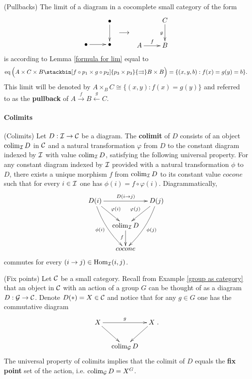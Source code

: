 \documentclass[thesis.tex]{subfiles}
\begin{document}
\begin{example}(Pullbacks)
The limit of a diagram in a cocomplete small category of the form \vspace*{-10pt}
$$\begin{array}{l}
\xymatrix{ & \bullet\ar[d] \\ \bullet\ar[r] & \bullet}
\end{array}\longrightarrow\begin{array}{l}
\xymatrix{& C\ar[d]_g\\ A\ar[r]^f & B}
\end{array}$$
is according to Lemma \ref{formula for lim} equal to $$\eq\Big(A\times C\times B\stackbin[f\circ p_1\times g\circ p_2]{p_3\times p_3}{\rightrightarrows}B\times B \Big)=\{(x,y,b):f(x)=g(y)=b\}.$$
This limit will be denoted by $A\times_B C\cong\{(x,y):f(x)=g(y)\}$ and referred to as the \textbf{pullback} of $A\stackrel{f}{\to}B\stackrel{g}{\leftarrow}C$.
\end{example}

\paragraph{Colimits}

\begin{definition} (Colimits)
Let $D:\operatorname{\mathcal{I}}\to\operatorname{\mathcal{C}}$ be a diagram. The \textbf{colimit} of $D$ consists of an object $\operatorname*{colim}_{\operatorname{\mathcal{I}}} D$ in $\operatorname{\mathcal{C}}$ and a natural transformation $\varphi$ from $D$ to the constant diagram indexed by $\operatorname{\mathcal{I}}$ with value $\operatorname*{colim}_{\operatorname{\mathcal{I}}} D$, satisfying the following universal property. For any constant diagram indexed by $\operatorname{\mathcal{I}}$ provided with a natural transformation $\phi$ to $D$, there exists a unique morphism $f$ from $\operatorname*{colim}_{\operatorname{\mathcal{I}}}D$ to its constant value $cocone$ such that for every $i\in\operatorname{\mathcal{I}}$ one has $\phi(i)=f\circ\varphi(i)$. Diagrammatically,
$$\xymatrix@C=.8pc @R=1.8pc{D(i)\ar[rr]^{D(i\to j)}\ar[rd]^{\varphi(i)}\ar@/_/[rdd]_{\phi(i)}& &\ar@/^/[ddl]^{\phi(j)}\ar[dl]_{\varphi(j)}D(j)\\ &\colim_{\I} D \ar_f[d]& \\
& cocone &}$$
commutes for every $(i\to j)\in\mathrm{Hom}_{\operatorname{\mathcal{I}}}(i,j)$.
\end{definition}

\begin{example}(Fix points) \label{fix points}
Let $\operatorname{\mathcal{C}}$ be a small category. Recall from Example \ref{group as category} that an object in $\operatorname{\mathcal{C}}$ with an action of a group $G$ can be thought of as a diagram $D:\operatorname{\mathcal{G}}\to\operatorname{\mathcal{C}}$. Denote $D(\ast)=X\in\operatorname{\mathcal{C}}$ and notice that for any $g\in G$ one has the commutative diagram $$\xymatrix@C=.8pc @R=1.8pc{X\ar[rr]^{g}\ar[rd]& &\ar[dl] X \\  &\colim_{\G} D & }.$$
The universal property of colimits implies that the colimit of $D$ equals the \textbf{fix point} set of the action, i.e. $\operatorname*{colim}_{\operatorname{\mathcal{G}}}D=X^G$.
\end{example}
\end{document}
